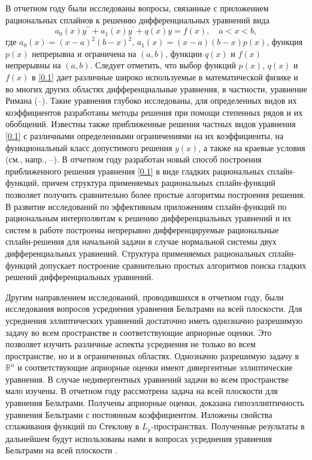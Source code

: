 В отчетном году были исследованы вопросы, связанные с приложением рациональных сплайнов к решению дифференциальных уравнений вида
\begin{equation}\label{0.1}
a_0(x) y^{\prime\prime}+a_1(x) y^\prime+q(x) y=f(x),\quad a< x<b,
\end{equation}
где $a_0(x)=(x-a)^2(b-x)^2$, $a_1(x)=(x-a)(b-x)p(x)$, функция $p(x)$ непрерывна и ограничена на $(a,b)$, функции $q(x)$ и $f(x)$ непрерывны на $(a,b)$.
Следует отметить, что выбор функций $p(x)$, $q(x)$ и $f(x)$ в \eqref{0.1} дает различные широко используемые в математической физике и во многих других областях дифференциальные уравнения, в частности, уравнение Римана (\cite{1}--\cite{3}). Такие уравнения глубоко
исследованы, для определенных видов их коэффициентов разработаны методы решения при помощи степенных рядов и их обобщений.
Известны также приближенные решения частных видов уравнения \eqref{0.1} с различными
определенными ограничениями на их коэффициенты, на функциональный класс допустимого
решения $y(x)$, а также на краевые условия (см., напр., \cite{4}--\cite{10}).
В отчетном году разработан новый способ построения приближенного решения уравнения
\eqref{0.1} в виде гладких рациональных сплайн-функций, причем структура применяемых
рациональных сплайн-функций позволяет получить сравнительно более простые алгоритмы
построения решения.
В развитие исследований по эффективным приложениям сплайн-функций по рациональным
 интерполянтам к решению дифференциальных уравнений и их систем в работе \cite{19}
 построены непрерывно дифференцируемые рациональные сплайн-решения
 для начальной задачи в случае нормальной системы двух дифференциальных уравнений.
Структура применяемых рациональных сплайн-функций допускает построение сравнительно
простых алгоритмов поиска гладких решений дифференциальных уравнений.

Другим направлением исследований, проводившихся в отчетном году, были исследования вопросов усреднения уравнения Бельтрами на всей плоскости.
Для усреднения эллиптических уравнений достаточно иметь однозначно разрешимую задачу во всем пространстве и соответствующие априорные оценки. Это позволяет изучить различные  аспекты усреднения не только во всем пространстве, но и в ограниченных областях. Однозначно разрешимую задачу в $\mathbb{R}^n$ и соответствующие априорные оценки имеют дивергентные эллиптические уравнения. В случае недивергентных уравнений задачи во всем пространстве мало изучены.
В отчетном году рассмотрена задача на всей плоскости для уравнения Бельтрами. Получены априорные оценки, доказана гипоэллиптичность уравнения Бельтрами с постоянным коэффициентом. Изложены свойства сглаживания функций по Стеклову в $L_p$-пространствах. Полученные результаты в дальнейшем будут использованы нами в вопросах усреднения уравнения Бельтрами на всей плоскости .

